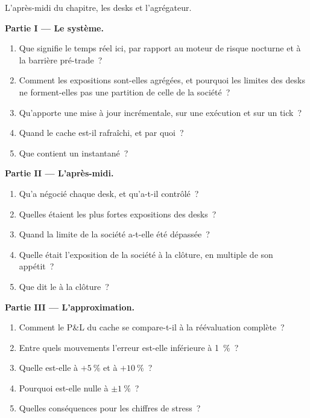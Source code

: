 \begin{problem}\label{pb:pl:real-time-risk:1}
L'après-midi du chapitre, les desks et l'agrégateur.

\medskip\noindent\textbf{Partie I --- Le système.}
\begin{enumerate}
\item Que signifie le temps réel ici, par rapport au moteur de risque nocturne et à la barrière pré-trade~?
\item Comment les expositions sont-elles agrégées, et pourquoi les limites des desks ne forment-elles pas une partition de celle de la société~?
\item Qu'apporte une mise à jour incrémentale, sur une exécution et sur un tick~?
\item Quand le cache est-il rafraîchi, et par quoi~?
\item Que contient un instantané~?
\end{enumerate}

\medskip\noindent\textbf{Partie II --- L'après-midi.}
\begin{enumerate}[resume]
\item Qu'a négocié chaque desk, et qu'a-t-il contrôlé~?
\item Quelles étaient les plus fortes expositions des desks~?
\item Quand la limite de la société a-t-elle été dépassée~?
\item Quelle était l'exposition de la société à la clôture, en multiple de son appétit~?
\item Que dit le  à la clôture~?
\end{enumerate}

\medskip\noindent\textbf{Partie III --- L'approximation.}
\begin{enumerate}[resume]
\item Comment le P\&L du cache se compare-t-il à la réévaluation complète~?
\item Entre quels mouvements l'erreur est-elle inférieure à 1~\%~?
\item Quelle est-elle à $+5~\%$ et à $+10~\%$~?
\item Pourquoi est-elle nulle à $\pm1~\%$~?
\item Quelles conséquences pour les chiffres de stress~?
\end{enumerate}


\end{problem}
